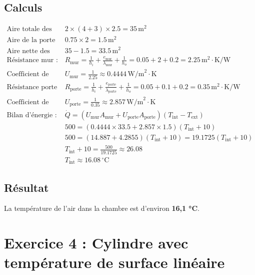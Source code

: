 \documentclass{rapportECL}
\begin{document}
\subsection*{Calculs}
\begin{align*}
\text{Aire totale des murs : } & 2 \times (4 + 3) \times 2.5 = 35 \, \text{m}^2 \\
\text{Aire de la porte : } & 0.75 \times 2 = 1.5 \, \text{m}^2 \\
\text{Aire nette des murs : } & 35 - 1.5 = 33.5 \, \text{m}^2 \\
\text{Résistance mur : } & R_{\text{mur}} = \frac{1}{h_i} + \frac{e_{\text{mur}}}{\lambda_{\text{mur}}} + \frac{1}{h_o} = 0.05 + 2 + 0.2 = 2.25 \, \text{m}^2 \cdot \text{K/W} \\
\text{Coefficient de transfert mur : } & U_{\text{mur}} = \frac{1}{2.25} \approx 0.4444 \, \text{W/m}^2 \cdot \text{K} \\
\text{Résistance porte : } & R_{\text{porte}} = \frac{1}{h_i} + \frac{e_{\text{porte}}}{\lambda_{\text{porte}}} + \frac{1}{h_o} = 0.05 + 0.1 + 0.2 = 0.35 \, \text{m}^2 \cdot \text{K/W} \\
\text{Coefficient de transfert porte : } & U_{\text{porte}} = \frac{1}{0.35} \approx 2.857 \, \text{W/m}^2 \cdot \text{K} \\
\text{Bilan d'énergie : } & \dot{Q} = (U_{\text{mur}} A_{\text{mur}} + U_{\text{porte}} A_{\text{porte}}) (T_{\text{int}} - T_{\text{ext}}) \\
& 500 = (0.4444 \times 33.5 + 2.857 \times 1.5) (T_{\text{int}} + 10) \\
& 500 = (14.887 + 4.2855) (T_{\text{int}} + 10) = 19.1725 (T_{\text{int}} + 10) \\
& T_{\text{int}} + 10 = \frac{500}{19.1725} \approx 26.08 \\
& T_{\text{int}} \approx 16.08 \, ^\circ \text{C}
\end{align*}

\subsection*{Résultat}
La température de l'air dans la chambre est d'environ \textbf{16,1 °C}.

\section{Exercice 4 : Cylindre avec température de surface linéaire}
\end{document}
